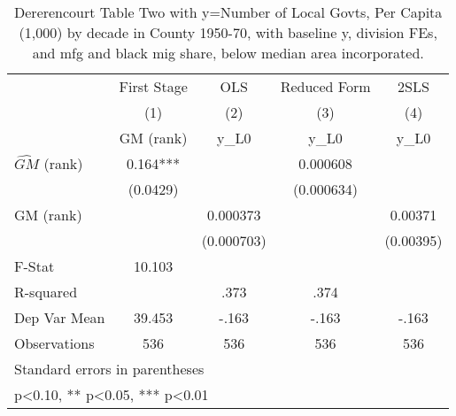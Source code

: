 \begin{table}[htbp]\centering
\def\sym#1{\ifmmode^{#1}\else\(^{#1}\)\fi}
\caption{Dererencourt Table Two with y=Number of Local Govts, Per Capita (1,000) by decade in County 1950-70, with baseline y, division FEs, and mfg and black mig share, below median area incorporated.}
\begin{tabular}{l*{4}{c}}
\toprule
                    & First Stage   &         OLS   &Reduced Form   &        2SLS   \\
                    &\multicolumn{1}{c}{(1)}&\multicolumn{1}{c}{(2)}&\multicolumn{1}{c}{(3)}&\multicolumn{1}{c}{(4)}\\
                    &\multicolumn{1}{c}{GM  (rank)}&\multicolumn{1}{c}{y\_L0}&\multicolumn{1}{c}{y\_L0}&\multicolumn{1}{c}{y\_L0}\\
\midrule
$\hat{GM}$ (rank)   &       0.164***&               &    0.000608   &               \\
                    &    (0.0429)   &               &  (0.000634)   &               \\
\addlinespace
GM  (rank)          &               &    0.000373   &               &     0.00371   \\
                    &               &  (0.000703)   &               &   (0.00395)   \\
\midrule
F-Stat              &      10.103   &               &               &               \\
R-squared           &               &        .373   &        .374   &               \\
Dep Var Mean        &      39.453   &       -.163   &       -.163   &       -.163   \\
Observations        &         536   &         536   &         536   &         536   \\
\bottomrule
\multicolumn{5}{l}{\footnotesize Standard errors in parentheses}\\
\multicolumn{5}{l}{\footnotesize * p<0.10, ** p<0.05, *** p<0.01}\\
\end{tabular}
\end{table}
